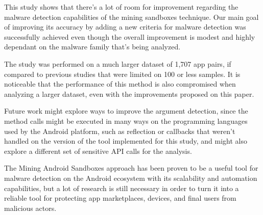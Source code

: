 This study shows that there's a lot of room for improvement regarding the malware detection capabilities of the mining sandboxes technique. Our main goal of improving its accuracy by adding a new criteria for malware detection was successfully achieved even though the overall improvement is modest and highly dependant on the malware family that's being analyzed.

The study was performed on a much larger dataset of 1,707 app pairs, if compared to previous studies that were limited on 100 or less samples. It is noticeable that the performance of this method is also compromised when analyzing a larger dataset, even with the improvements proposed on this paper.

Future work might explore ways to improve the argument detection, since the method calls might be executed in many ways on the programming languages used by the Android platform, such as reflection or callbacks that weren't handled on the version of the tool implemented for this study, and might also  explore a different set of sensitive API calls for the analysis.

The Mining Android Sandboxes approach has been proven to be a useful tool for malware detection on the Android ecosystem with its scalability and automation capabilities, but a lot of research is still necessary in order to turn it into a reliable tool for protecting app marketplaces, devices, and final users from malicious actors.